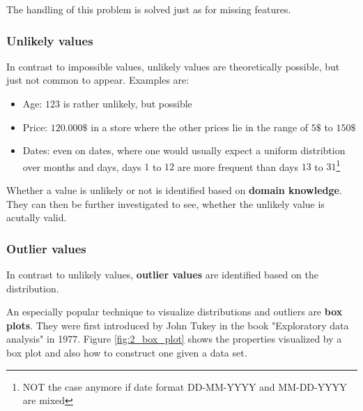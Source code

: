 The handling of this problem is solved just as for missing features.

\subsubsection*{Unlikely values}
In contrast to impossible values, unlikely values are theoretically possible, but just not common to appear. Examples are:
\begin{itemize}
  \item Age: $123$ is rather unlikely, but possible
  \item Price: $120.000\$$ in a store where the other prices lie in the range of $5\$$ to $150\$$
  \item Dates: even on dates, where one would usually expect a uniform distribtion over months and days, days $1$ to $12$ are more frequent than days $13$ to $31$\footnote{NOT the case anymore if date format \textcolor{mathblue}{DD-MM-YYYY} and \textcolor{mathblue}{MM-DD-YYYY} are mixed}
\end{itemize}
Whether a value is unlikely or not is identified based on \textbf{domain knowledge}. They can then be further investigated to see, whether the unlikely value is acutally valid.


\subsubsection*{Outlier values}
In contrast to unlikely values, \textbf{outlier values} are identified based on the distribution. 

An especially popular technique to visualize distributions and outliers are \textbf{box plots}. They were first introduced by John Tukey in the book "Exploratory data analysis" in 1977. Figure \ref{fig:2_box_plot} shows the properties visualized by a box plot and also how to construct one given a data set. 

